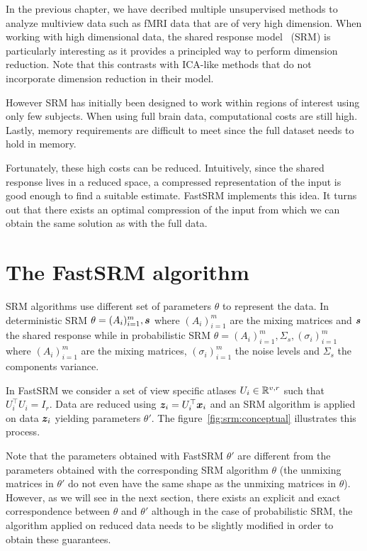 In the previous chapter, we have decribed multiple unsupervised methods to analyze
multiview data such as fMRI data that are of very high dimension.
When working with high dimensional data, the shared response model~\cite{chen2015reduced} (SRM) is particularly
interesting as it provides a principled way to perform dimension reduction. Note that this
contrasts with ICA-like methods that do not incorporate dimension reduction in their model.

However SRM has initially been designed to work within regions of interest using
only few subjects. When using full brain data, computational costs are still
high. Lastly, memory requirements are difficult to meet since the full dataset needs to hold
in memory.

Fortunately, these high costs can be reduced. Intuitively, since the shared
response lives in a reduced space, a compressed representation of the input is
good enough to find a suitable estimate.
FastSRM implements this idea. It turns out that there exists an optimal
compression of the input from which we can obtain the same solution as
with the full data.

\section{The FastSRM algorithm}
SRM algorithms use different set of parameters $\theta$ to represent the data.
In deterministic SRM $\theta = (A_i)_{i=1}^m, \boldsymbol{s}$ where $(A_i)_{i=1}^m$ are the
mixing matrices and $\boldsymbol{s}$ the shared response while in probabilistic SRM $\theta
= (A_i)_{i=1}^m, \Sigma_s, (\sigma_i)_{i=1}^m$ where $(A_i)_{i=1}^m$ are the
mixing matrices, $(\sigma_i)_{i=1}^m$ the noise levels and $\Sigma_s$ the
components variance.

In FastSRM we consider a set of view specific atlases $U_i \in \mathbb{R}^{v, r}$ such that
$U_i^{\top}U_i = I_r$.
Data are reduced using $\boldsymbol{z}_i = U_i^{\top} \boldsymbol{x}_i$ and an SRM algorithm is applied
on data $\boldsymbol{z}_i$ yielding parameters $\theta'$.
The figure~\ref{fig:srm:conceptual} illustrates this process.

Note that the parameters obtained with FastSRM $\theta'$ are different
from the parameters obtained with the corresponding SRM algorithm $\theta$ (the unmixing matrices in $\theta'$ do not even have the same shape as the unmixing matrices in $\theta$).
However, as we will see in the next section, there exists an explicit and exact
correspondence between $\theta$ and $\theta'$ although in the case of
probabilistic SRM, the algorithm applied on reduced data needs to be slightly modified in order to
obtain these guarantees. 

